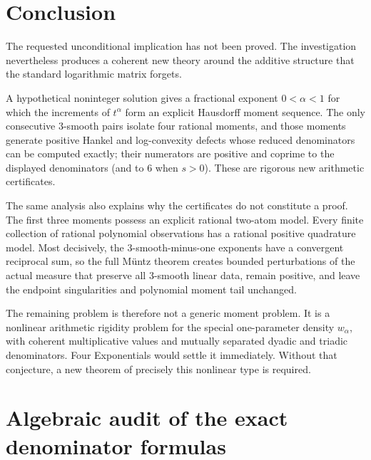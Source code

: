 \documentclass[11pt,oneside]{article}
\theoremstyle{definition}
\theoremstyle{remark}
\begin{document}
\section{Conclusion}

The requested unconditional implication has not been proved.  The investigation nevertheless
produces a coherent new theory around the additive structure that the standard logarithmic
matrix forgets.

A hypothetical noninteger solution gives a fractional exponent $0<\alpha<1$ for which the
increments of $t^\alpha$ form an explicit Hausdorff moment sequence.  The only consecutive
$3$-smooth pairs isolate four rational moments, and those moments generate positive Hankel and
log-convexity defects whose reduced denominators can be computed exactly; their numerators are positive and coprime to the displayed denominators (and to $6$ when $s>0$).  These are rigorous new arithmetic certificates.

The same analysis also explains why the certificates do not constitute a proof.  The first
three moments possess an explicit rational two-atom model.  Every finite collection of rational
polynomial observations has a rational positive quadrature model.  Most decisively, the
$3$-smooth-minus-one exponents have a convergent reciprocal sum, so the full M\"untz theorem
creates bounded perturbations of the actual measure that preserve all $3$-smooth linear data,
remain positive, and leave the endpoint singularities and polynomial moment tail unchanged.

The remaining problem is therefore not a generic moment problem.  It is a nonlinear arithmetic
rigidity problem for the special one-parameter density $w_\alpha$, with coherent multiplicative
values and mutually separated dyadic and triadic denominators.  Four Exponentials would settle
it immediately.  Without that conjecture, a new theorem of precisely this nonlinear type is
required.

\appendix

\section{Algebraic audit of the exact denominator formulas}
\end{document}
